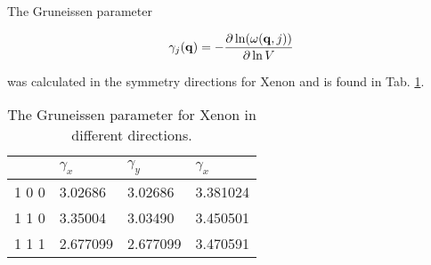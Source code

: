 The Gruneissen parameter

\begin{equation}
  \label{eq:Gruneissen}
  \gamma_j(\mathbf{q}) = -\frac{\partial \ln (\omega (\mathbf{q},j))}{\partial \ln V}
\end{equation}

was calculated in the symmetry directions for Xenon and is found in Tab. \ref{tab:grun}.

\begin{table}[H]
\centering
  \caption{The Gruneissen parameter for Xenon in different directions.}
  \label{tab:grun}
  \begin{tabular}{l|lll}
   & $\gamma_x$ & $\gamma_y$ & $\gamma_x$ \\ \hline
   1 0 0 & 3.02686 & 3.02686 & 3.381024 \\
   1 1 0 & 3.35004 & 3.03490 & 3.450501 \\
   1 1 1 & 2.677099 & 2.677099 & 3.470591
  \end{tabular}
\end{table}
